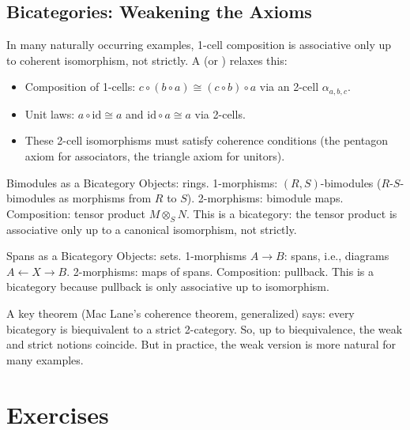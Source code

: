 \subsection{Bicategories: Weakening the Axioms}

In many naturally occurring examples, 1-cell composition is associative
only up to coherent isomorphism, not strictly. A 
(or ) relaxes this:
\begin{itemize}
  \item Composition of 1-cells: $c \circ (b \circ a) \cong (c \circ b)
        \circ a$ via an  2-cell $\alpha_{a,b,c}$.
  \item Unit laws: $a \circ \mathrm{id} \cong a$ and $\mathrm{id} \circ a
        \cong a$ via  2-cells.
  \item These 2-cell isomorphisms must satisfy coherence conditions
        (the pentagon axiom for associators, the triangle axiom for unitors).
\end{itemize}

\begin{example}{Bimodules as a Bicategory}
Objects: rings. 1-morphisms: $(R,S)$-bimodules ($R\text{-}S$-bimodules as
morphisms from $R$ to $S$). 2-morphisms: bimodule maps. Composition:
tensor product $M \otimes_S N$. This is a bicategory: the tensor product
is associative only up to a canonical isomorphism, not strictly.
\end{example}

\begin{example}{Spans as a Bicategory}
Objects: sets. 1-morphisms $A \to B$: spans, i.e., diagrams $A \leftarrow
X \rightarrow B$. 2-morphisms: maps of spans. Composition: pullback. This
is a bicategory because pullback is only associative up to isomorphism.
\end{example}

A key theorem (Mac Lane's coherence theorem, generalized) says:
every bicategory is biequivalent to a strict 2-category. So, up to
biequivalence, the weak and strict notions coincide. But in practice,
the weak version is more natural for many examples.


\section{Exercises}
\label{sec:2cat-exercises}

